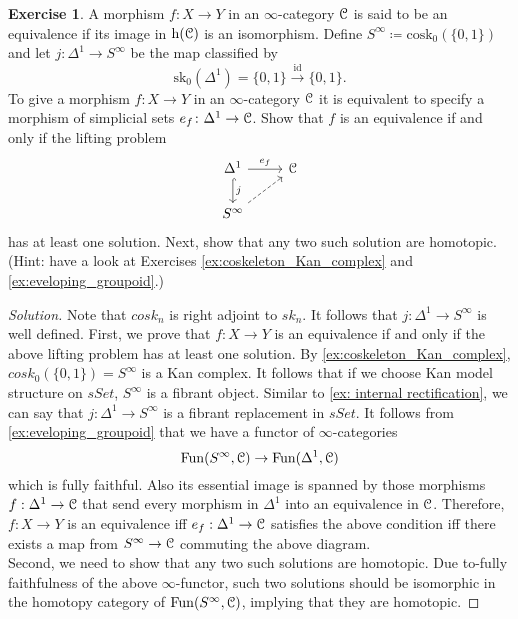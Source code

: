 \documentclass[10pt,a4paper,reqno,oneside]{book} %
\theoremstyle{plain}
\theoremstyle{definition}
\newtheorem{exercise}[thm]{Exercise}
\theoremstyle{remark}
\numberwithin{equation}{section}
\begin{document}
\begin{exercise} \label{ex:equivalences_S_infty}
	A morphism $f \colon X \to Y$ in an $\infty$-category $\mathcal C$ is said to be an equivalence if its image in $\mathrm h(\mathcal C)$ is an isomorphism.
	Define $S^\infty \coloneqq \mathrm{cosk}_0(\{0,1\})$ and let $j \colon \Delta^1 \to S^\infty$ be the map classified by
	\[ \mathrm{sk}_0(\Delta^1) = \{0,1\} \xrightarrow{\mathrm{id}} \{0,1\} . \]
	To give a morphism $f \colon X \to Y$ in an $\infty$-category $\mathcal C$ it is equivalent to specify a morphism of simplicial sets $e_f \colon \Delta^1 \to \mathcal C$.
	Show that $f$ is an equivalence if and only if the lifting problem
	\[ \begin{tikzcd}
		\Delta^1 \arrow[hook]{d}{j} \arrow{r}{e_f} & \cC \\
		S^\infty \arrow[dashed]{ur}
	\end{tikzcd} \]
	has at least one solution.
	Next, show that any two such solution are homotopic.
	(Hint: have a look at Exercises \ref{ex:coskeleton_Kan_complex} and \ref{ex:eveloping_groupoid}.)
\end{exercise}

\ifpersonal
\begin{proof}[Solution] 
    Note that $cosk_n$ is right adjoint to $sk_n$. It follows that $j:\Delta^1 \to S^{\infty}$ is well defined. First, we prove that $f:X \to Y$ is an equivalence if and only if the above lifting problem has at least one solution. By \ref{ex:coskeleton_Kan_complex}, $cosk_0(\{0,1\})=S^{\infty}$ is a Kan complex. It follows that if we choose Kan model structure on $sSet$, $S^{\infty}$ is a fibrant object. Similar to \ref{ex: internal rectification}, we can say that $j:\Delta^1 \to S^{\infty}$ is a fibrant replacement in $sSet$. It follows from \ref{ex:eveloping_groupoid} that we have a functor of $\infty$-categories 
    \[ \operatorname{Fun}(S^{\infty}, \mathcal C) \to \operatorname{Fun}(\Delta^1, \mathcal C)\]
    which is fully faithful. Also its essential image is spanned by those morphisms $f:\Delta^1 \to \mathcal C$ that send every morphism in $\Delta^1$ into an equivalence in $\mathcal C$. Therefore, $f:X \to Y$ is an equivalence iff $e_f:\Delta^1 \to \mathcal C$ satisfies the above condition iff there exists a map from $S^{\infty} \to \mathcal C$ commuting the above diagram. \\
    Second, we need to show that any two such solutions are homotopic. Due to-fully faithfulness of the above $\infty$-functor, such two solutions should be isomorphic in the homotopy category of 
    $\operatorname{Fun}(S^{\infty}, \mathcal C)$, implying that they are homotopic.
\end{proof}
\fi
\end{document}
